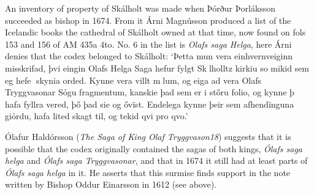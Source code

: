 \documentclass[11pt,twoside]{article}\makeatletter
\begin{document}
An inventory of property of Skálholt was made when Þórður Þorláksson succeeded as bishop in 1674. From it Árni Magnússon produced a list of the Icelandic books the cathedral of Skálholt owned at that time, now found on fols 153 and 156 of AM 435a 4to. No. 6 in the list is \textit{Olafs saga Helga}, here Árni denies that the codex belonged to Skálholt: ‘Þetta mun vera einhvernveiginn mis{\hskip1pt}\newline skrifad, þvi eingin Olafs Helga Saga {\hskip1pt}\newline  hefur fylgt Sklholltz kirkiu so mikid  sem eg hefe skynia orded. Kynne {\hskip1pt}\newline  vera villt mlum, og eiga ad vera {\hskip1pt}\newline  Olafs Tryggvasonar Sỏgu frag{\hskip1pt}\newline mentum, kanskie þad sem er i {\hskip1pt}\newline  stőru folio, og kynne þ hafa fyll{\hskip1pt}\newline ra vered, þő þad sie og ővïst. {\hskip1pt}\newline  Endelega kynne þeir sem afhend{\hskip1pt}\newline ïnguna giỏrdu, hafa lited skagt til, {\hskip1pt}\newline  og tekid qvi pro qvo.’ \par
Ólafur Haldórsson (\textit{The Saga of King Olaf Tryggvason18}) suggests that it is possible that the codex originally contained the sagas of both kings, \textit{Ólafs saga helga} and \textit{Ólafs saga Tryggvasonar}, and that in 1674 it still had at least parts of \textit{Ólafs saga helga} in it. He asserts that this surmise finds support in the note written by Bishop Oddur Einarsson in 1612 (see above).
\end{document}
